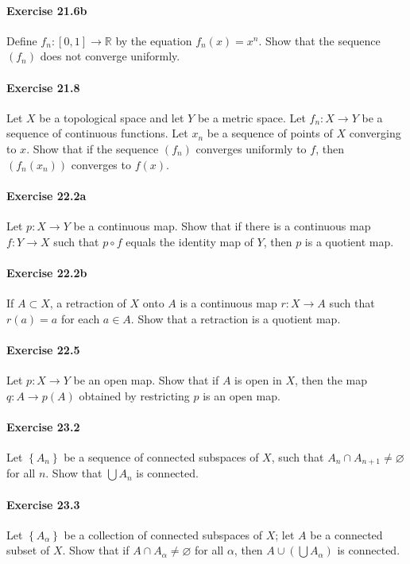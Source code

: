 \documentclass{article}
\begin{document}
\paragraph{Exercise 21.6b} Define $f_{n}:[0,1] \rightarrow \mathbb{R}$ by the equation $f_{n}(x)=x^{n}$. Show that the sequence $\left(f_{n}\right)$ does not converge uniformly.


\paragraph{Exercise 21.8} Let $X$ be a topological space and let $Y$ be a metric space. Let $f_{n}: X \rightarrow Y$ be a sequence of continuous functions. Let $x_{n}$ be a sequence of points of $X$ converging to $x$. Show that if the sequence $\left(f_{n}\right)$ converges uniformly to $f$, then $\left(f_{n}\left(x_{n}\right)\right)$ converges to $f(x)$.


\paragraph{Exercise 22.2a} Let $p: X \rightarrow Y$ be a continuous map. Show that if there is a continuous map $f: Y \rightarrow X$ such that $p \circ f$ equals the identity map of $Y$, then $p$ is a quotient map.


\paragraph{Exercise 22.2b} If $A \subset X$, a retraction of $X$ onto $A$ is a continuous map $r: X \rightarrow A$ such that $r(a)=a$ for each $a \in A$. Show that a retraction is a quotient map.


\paragraph{Exercise 22.5} Let $p \colon X \rightarrow Y$ be an open map. Show that if $A$ is open in $X$, then the map $q \colon A \rightarrow p(A)$ obtained by restricting $p$ is an open map.


\paragraph{Exercise 23.2} Let $\left\{A_{n}\right\}$ be a sequence of connected subspaces of $X$, such that $A_{n} \cap A_{n+1} \neq \varnothing$ for all $n$. Show that $\bigcup A_{n}$ is connected.


\paragraph{Exercise 23.3} Let $\left\{A_{\alpha}\right\}$ be a collection of connected subspaces of $X$; let $A$ be a connected subset of $X$. Show that if $A \cap A_{\alpha} \neq \varnothing$ for all $\alpha$, then $A \cup\left(\bigcup A_{\alpha}\right)$ is connected.
\end{document}
